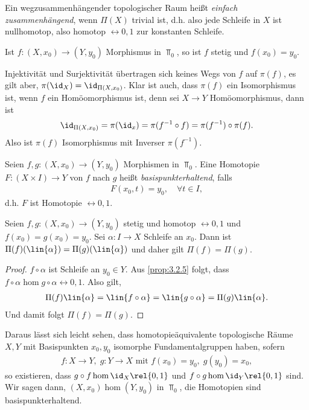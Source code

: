\begin{defn}
\label{prop:3.2.8}
Ein wegzusammenhängender topologischer Raum heißt \emph{einfach
zusammenhängend}, wenn $\Pi(X)$ trivial ist, d.h. also jede Schleife in $X$ ist
nullhomotop, also homotop $\rel{0,1}$ zur konstanten Schleife.\fishhere
\end{defn}

Ist $f: (X,x_0)\to (Y,y_0)$ Morphismus in $\Top_0$, so ist $f$ stetig und
$f(x_0) = y_0$.

\begin{bem}[Warnung.]
\label{bem:3.2.9}
Injektivität und Surjektivität übertragen sich keines Wegs von $f$ auf
$\pi(f)$, es gilt aber, $\pi(\id_X) = \id_{\Pi(X,x_0)}$. Klar ist auch,
dass $\pi(f)$ ein Isomorphismus ist, wenn $f$ ein Homöomorphismus ist, denn sei
$X\to Y$ Homöomorphismus, dann ist
\begin{align*}
\id_{\Pi(X,x_0)} = \pi(\id_x) = \pi(f^{-1}\circ f) = \pi(f^{-1})\circ\pi(f).
\end{align*}
Also ist $\pi(f)$ Isomorphismus mit Inverser $\pi(f^{-1})$.\maphere
\end{bem}

\begin{defn}
\label{defn:3.2.10}
Seien $f,g: (X,x_0)\to(Y,y_0)$ Morphismen in $\Top_0$. Eine Homotopie $F:
(X\times I)\to Y$ von $f$ nach $g$ heißt \emph{basispunkterhaltend}, falls
\begin{align*}
F(x_0,t)=y_0,\quad \forall t\in I,
\end{align*}
d.h. $F$ ist Homotopie $\rel{0,1}$.\fishhere
\end{defn}

\begin{prop}
\label{prop:3.2.11}
Seien $f,g: (X,x_0)\to (Y,y_0)$ stetig und homotop $\rel{0,1}$ und $f(x_0) =
g(x_0) = y_0$. Sei $\alpha: I\to X$ Schleife an $x_0$. Dann ist $\Pi(f)(\lin{\alpha}) =
\Pi(g)(\lin{\alpha})$ und daher gilt $\Pi(f) = \Pi(g)$.\fishhere
\end{prop}
\begin{proof}
$f\circ\alpha$ ist Schleife an $y_0\in Y$. Aus \ref{prop:3.2.5} folgt, dass
$f\circ\alpha \hom g\circ\alpha\rel{0,1}$. Also gilt,
\begin{align*}
\Pi(f)\lin{\alpha} = \lin{f\circ\alpha} = \lin{g\circ\alpha} =
\Pi(g)\lin{\alpha}.
\end{align*}
Und damit folgt $\Pi(f) = \Pi(g)$.\qedhere
\end{proof}

Daraus lässt sich leicht sehen, dass homotopieäquivalente topologische Räume
$X,Y$ mit Basispunkten $x_0,y_0$ isomorphe Fundamentalgruppen haben, sofern
\begin{align*}
f:X\to Y,\; g:Y\to X\text{ mit }f(x_0) = y_0,\;g(y_0) = x_0,
\end{align*}
so existieren, dass $g\circ f\hom\id_X\rel{0,1}$ und $f\circ g\hom
\id_Y\rel{0,1}$ sind. Wir sagen dann, $(X,x_0)\hom(Y,y_0)$ in $\Top_0$, die
Homotopien sind basispunkterhaltend.

